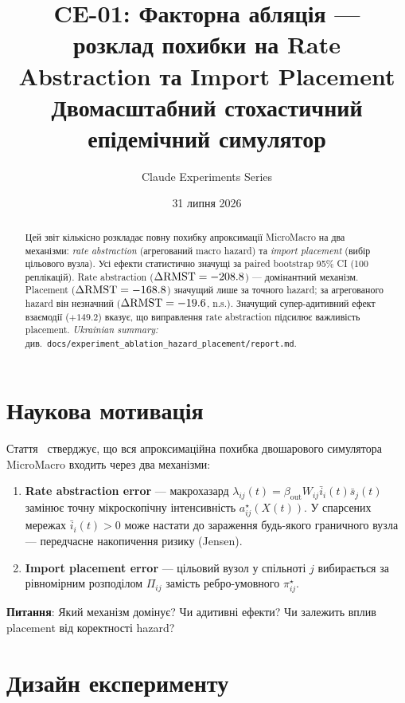\documentclass[11pt,a4paper]{article}
\title{\textbf{CE-01: Факторна абляція ---\\
розклад похибки на Rate Abstraction та Import Placement}\\[0.5em]
\large Двомасштабний стохастичний епідемічний симулятор}
\author{Claude Experiments Series}
\date{31 липня 2026}
\begin{document}
\maketitle

\begin{abstract}
Цей звіт кількісно розкладає повну похибку апроксимації MicroMacro
на два механізми: \emph{rate abstraction} (агрегований macro hazard) та
\emph{import placement} (вибір цільового вузла).
Усі ефекти статистично значущі за paired bootstrap 95\% CI
(100 реплікацій).
Rate abstraction ($\Delta\mathrm{RMST} = -208.8$) --- домінантний механізм.
Placement ($\Delta\mathrm{RMST} = -168.8$) значущий лише за точного hazard;
за агрегованого hazard він незначний ($\Delta\mathrm{RMST} = -19.6$, n.s.).
Значущий супер-адитивний ефект взаємодії ($+149.2$) вказує,
що виправлення rate abstraction підсилює важливість placement.
\textit{Ukrainian summary: }
див.\ \texttt{docs/experiment\_ablation\_hazard\_placement/report.md}.
\end{abstract}

\tableofcontents
\clearpage

\section{Наукова мотивація}

Стаття~\cite{main} стверджує, що вся апроксимаційна похибка двошарового
симулятора MicroMacro входить через два механізми:
\begin{enumerate}
  \item \textbf{Rate abstraction error} --- макрохазард
        $\lambda_{ij}(t) = \beta_{\mathrm{out}} W_{ij} \bar{i}_i(t)\bar{s}_j(t)$
        замінює точну мікроскопічну інтенсивність $a^{\star}_{ij}(X(t))$.
        У спарсених мережах $\bar{i}_i(t) > 0$ може настати до зараження
        будь-якого граничного вузла --- передчасне накопичення ризику (Jensen).
  \item \textbf{Import placement error} --- цільовий вузол у спільноті $j$
        вибирається за рівномірним розподілом $\Pi_{ij}$ замість
        ребро-умовного $\pi^{\star}_{ij}$.
\end{enumerate}

\textbf{Питання}: Який механізм домінує? Чи адитивні ефекти?
Чи залежить вплив placement від коректності hazard?

\section{Дизайн експерименту}
\end{document}
